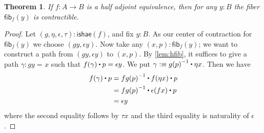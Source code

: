 \documentclass[10pt,a4paper]{article}
\newcommand{\defeq}{\vcentcolon\equiv}  %
\newcommand{\id}[3][]{\ensuremath{#2 =_{#1} #3}\xspace}
\newcommand{\ct}{%
  \mathchoice{\mathbin{\raisebox{0.5ex}{$\displaystyle\centerdot$}}}%
             {\mathbin{\raisebox{0.5ex}{$\centerdot$}}}%
             {\mathbin{\raisebox{0.25ex}{$\scriptstyle\,\centerdot\,$}}}%
             {\mathbin{\raisebox{0.1ex}{$\scriptscriptstyle\,\centerdot\,$}}}
}
\newcommand{\opp}[1]{\mathord{{#1}^{-1}}}
\newcommand{\map}[2]{\ensuremath{{#1}\mathopen{}\left({#2}\right)\mathclose{}}\xspace}
\let\ap\map
\newcommand{\ishae}{\ensuremath{\mathsf{ishae}}}
\newcommand{\hfib}[2]{{\mathsf{fib}}_{#1}(#2)}
\newtheorem{thm}{Theorem}[section]
\theoremstyle{definition}
\theoremstyle{remark}
\numberwithin{equation}{section}
\begin{document}
\begin{thm}\label{thm:contr-hae}
  If $f:A\to B$ is a half adjoint equivalence, then for any $y:B$ the fiber $\hfib f y$ is contractible.
\end{thm}

\begin{proof}
  Let $(g,\eta,\epsilon,\tau) : \ishae(f)$, and fix $y : B$.
  As our center of contraction for $\hfib{f}{y}$ we choose $(gy, \epsilon y)$.
  Now take any $(x,p) : \hfib{f}{y}$; we want to construct a path from $(gy, \epsilon y)$ to $(x,p)$.
  By \cref{lem:hfib}, it suffices to give a path $\gamma : \id{gy}{x}$ such that $\ap f\gamma \ct p = \epsilon y$.
  We put $\gamma \defeq \opp{g(p)} \ct \eta x$.
  Then we have
  \begin{align*}
    f(\gamma) \ct p & = \opp{fg(p)} \ct f (\eta x) \ct p \\
    & = \opp{fg(p)} \ct \epsilon(fx) \ct p \\
    & = \epsilon y
  \end{align*}
  where the second equality follows by $\tau x$ and the third equality is naturality of $\epsilon$.
\end{proof}
\end{document}
